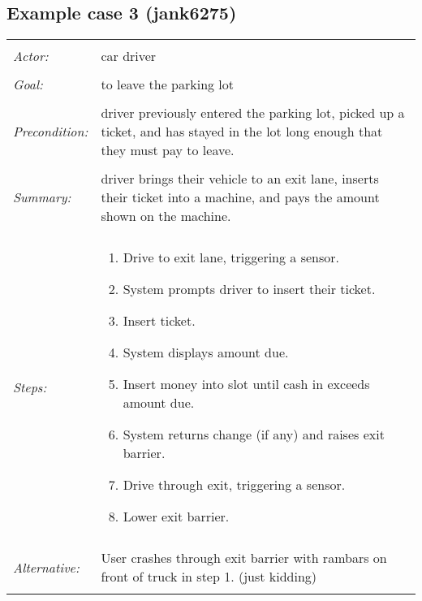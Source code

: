\documentclass[11pt]{report}
\begin{document}
\subsection{Example case 3 (jank6275)}
\begin{tabular}{ p{2cm} p{12cm} }
 \hline
 \\
 \textit{Actor:} & car driver \\ 
 \\
 \textit{Goal:} & to leave the parking lot \\
 \\
 \textit{Precondition:} & driver previously entered the parking lot, picked up a ticket, and has stayed in the lot long enough that they must pay to leave. \\
 \\
 \textit{Summary:} & driver brings their vehicle to an exit lane, inserts their ticket into a machine, and pays the amount shown on the machine. \\ 
 \\
 \textit{Steps:} & \begin{enumerate}
  \item Drive to exit lane, triggering a sensor.
  \item System prompts driver to insert their ticket.
  \item Insert ticket.
  \item System displays amount due.
  \item Insert money into slot until cash in exceeds amount due.
  \item System returns change (if any) and raises exit barrier.
  \item Drive through exit, triggering a sensor.
  \item Lower exit barrier.
 \end{enumerate} \\
 \\
 \textit{Alternative:} & User crashes through exit barrier with rambars on front of truck in step 1. (just kidding) \\
 \\
\hline
\end{tabular}
\end{document}
